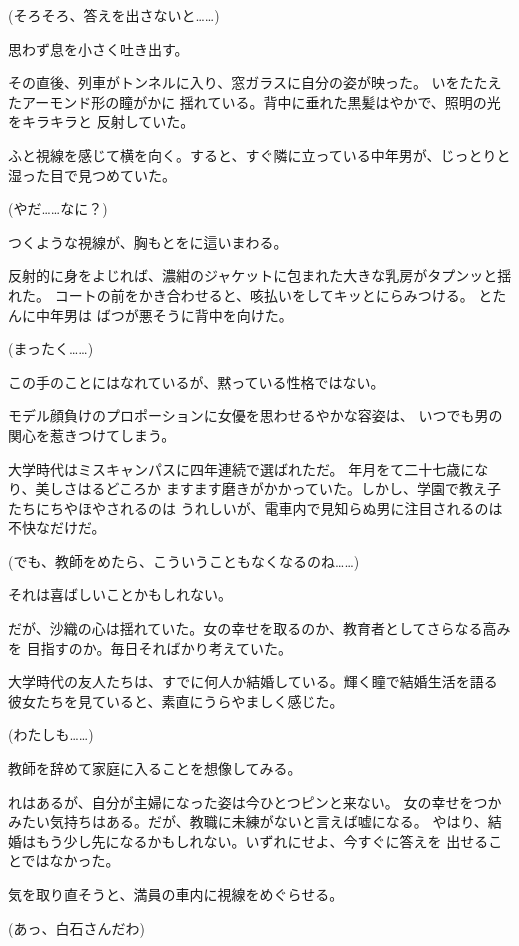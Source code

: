 ﻿\documentclass[
    book,tate,
    line_length=30zw,
    jafontsize=12pt,
    paper=b5j,
    landscape,
    ]{jlreq}
\begin{document}
(そろそろ、答えを出さないと……)

思わず息を小さく吐き出す。

その直後、列車がトンネルに入り、窓ガラスに自分の姿が映った。
いをたたえたアーモンド形の瞳がかに
揺れている。背中に垂れた黒髪はやかで、照明の光をキラキラと
反射していた。

ふと視線を感じて横を向く。すると、すぐ隣に立っている中年男が、じっとりと
湿った目で見つめていた。

(やだ……なに？)

つくような視線が、胸もとをに這いまわる。

反射的に身をよじれば、濃紺のジャケットに包まれた大きな乳房がタプンッと揺れた。
コートの前をかき合わせると、咳払いをしてキッとにらみつける。 とたんに中年男は
ばつが悪そうに背中を向けた。

(まったく……)

この手のことにはなれているが、黙っている性格ではない。

モデル顔負けのプロポーションに女優を思わせるやかな容姿は、
いつでも男の関心を惹きつけてしまう。

大学時代はミスキャンパスに四年連続で選ばれただ。
年月をて二十七歳になり、美しさはるどころか
ますます磨きがかかっていた。しかし、学園で教え子たちにちやほやされるのは
うれしいが、電車内で見知らぬ男に注目されるのは不快なだけだ。

(でも、教師をめたら、こういうこともなくなるのね……)

それは喜ばしいことかもしれない。

だが、沙織の心は揺れていた。女の幸せを取るのか、教育者としてさらなる高みを
目指すのか。毎日そればかり考えていた。

大学時代の友人たちは、すでに何人か結婚している。輝く瞳で結婚生活を語る
彼女たちを見ていると、素直にうらやましく感じた。

(わたしも……)

教師を辞めて家庭に入ることを想像してみる。

れはあるが、自分が主婦になった姿は今ひとつピンと来ない。
女の幸せをつかみたい気持ちはある。だが、教職に未練がないと言えば嘘になる。
やはり、結婚はもう少し先になるかもしれない。いずれにせよ、今すぐに答えを
出せることではなかった。

気を取り直そうと、満員の車内に視線をめぐらせる。

(あっ、白石さんだわ)
\end{document}

